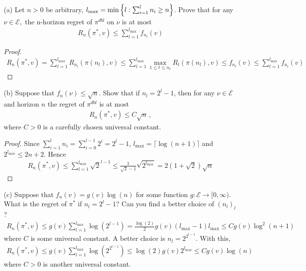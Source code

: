 \begin{enumerate}
    \item[(a)]  Let $n > 0$ be arbitrary, $l_{\max} = \min\left\{ l :\sum_{i=1}^l n_i \geq n \right\}$. Prove that for any $ν \in\mathcal{E},$ the n-horizon regret of $\pi^{dbl}$ on $ν$ is at most
    \begin{align*}
        R_n(\pi^*,v)\leq \sum_{l=1}^{l_{\max}}f_{n_l}(v)
    \end{align*}
    \begin{proof}
    \begin{align*}
        R_n(\pi^*,v) = \sum_{l=1}^{l_{\max}} R_{n_l}(\pi(n_l),v) \leq \sum_{l=1}^{l_{\max}} \max_{1\leq t\leq n_l} R_t(\pi(n_l),v)\leq f_{n_l}(v) \leq \sum_{l=1}^{l_{\max}}f_{n_l}(v)
    \end{align*}
    \end{proof}
    \item[(b)] Suppose that $f_n(ν) ≤ \sqrt{n}$. Show that if $n_l = 2^l −1$, then for any $ν\in \mathcal{E}$ and horizon $n$ the regret of $\pi^{dbl}$ is at most
    \begin{align*}
        R_n(\pi^*,v)\leq C\sqrt{n} \, ,
    \end{align*}
    where $C > 0$ is a carefully chosen universal constant.
    \begin{proof}
        Since $\sum_{i=1}^{l}n_i = \sum_{i=0}^{l-1}2^i = 2^l-1$, $l_{\max} = \lceil \log(n+1)\rceil$ and $2^{l_{\max}}\leq 2n+2$. Hence
        \begin{align*}
            R_n(\pi^*,v) \leq \sum_{l=1}^{l_{\max}} \sqrt{2}^{l-1}\leq \frac{1}{\sqrt{2}-1} \sqrt{2^{l_{\max}}} = 2(1+\sqrt{2})\sqrt{n}
        \end{align*}
    \end{proof}
    \item[(c)] Suppose that $f_n(v) = g(v) \log(n)$ for some function $g : \mathcal{E} → [0, \infty)$. What is the regret of $\pi^*$ if $n_l = 2^l −1$? Can you find a better choice of $(n_l)_l$ ?
    \begin{align*}
        R_n(\pi^*,v)\leq g(v)\sum_{l=1}^{l_{\max}}\log(2^{l-1})
        =\frac{\log(2)}{2}g(v)(l_{\max}-1)l_{\max}\leq C g(v)\log^2(n+1)
    \end{align*}
    where $C$ is some universal constant. A better choice is $n_l = 2^{2^{l-1}}$. With this,
    \begin{align*}
        R_n(\pi^*,v)\leq g(v)\sum_{l=1}^{l_{\max}} \log(2^{2^{l-1}})\leq \log(2)g(v)2^{l_{\max}}\leq Cg(v)\log(n)
    \end{align*}
    where $C>0$ is another universal constant.
\end{enumerate}

